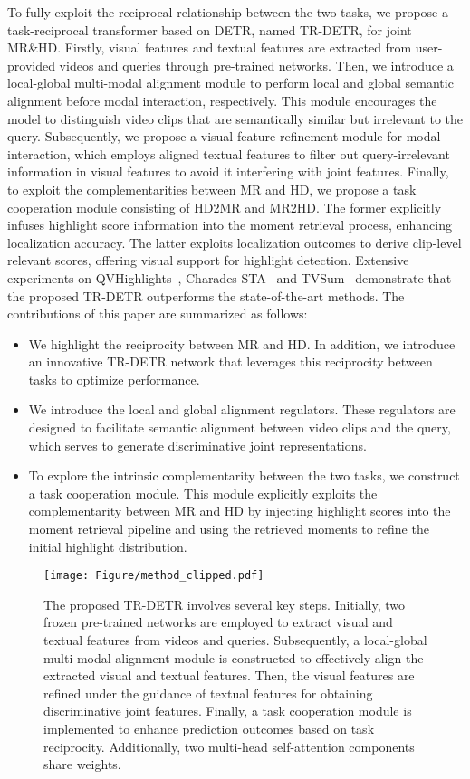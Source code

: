 To fully exploit the reciprocal relationship between the two tasks, we propose a task-reciprocal transformer based on DETR, named TR-DETR, for joint MR\&HD. Firstly, visual features and textual features are extracted from user-provided videos and queries through pre-trained networks. Then, we introduce a local-global multi-modal alignment module to perform local and global semantic alignment before modal interaction, respectively. This module encourages the model to distinguish video clips that are semantically similar but irrelevant to the query. Subsequently, we propose a visual feature refinement module for modal interaction, which employs aligned textual features to filter out query-irrelevant information in visual features to avoid it interfering with joint features. Finally, to exploit the complementarities between MR and HD, we propose a task cooperation module consisting of HD2MR and MR2HD. The former explicitly infuses highlight score information into the moment retrieval process, enhancing localization accuracy. The latter exploits localization outcomes to derive clip-level relevant scores, offering visual support for highlight detection.
Extensive experiments on QVHighlights~\cite{lei2021detecting}, Charades-STA~\cite{gao2017tall} and TVSum~\cite{song2015tvsum} demonstrate that the proposed TR-DETR outperforms the state-of-the-art methods. The contributions of this paper are summarized as follows:

\begin{itemize}
    \item We highlight the reciprocity between MR and HD. In addition, we introduce an innovative TR-DETR network that leverages this reciprocity between tasks to optimize performance.
    \item We introduce the local and global alignment regulators. These regulators are designed to facilitate semantic alignment between video clips and the query, which serves to generate discriminative joint representations.
    \item To explore the intrinsic complementarity between the two tasks, we construct a task cooperation module. This module explicitly exploits the complementarity between MR and HD by injecting highlight scores into the moment retrieval pipeline and using the retrieved moments to refine the initial highlight distribution.
\end{itemize}

\begin{figure*}[t]
\centering
\texttt{[image: Figure/method\_clipped.pdf]} %
\caption{The proposed TR-DETR involves several key steps. Initially, two frozen pre-trained networks are employed to extract visual and textual features from videos and queries. Subsequently, a local-global multi-modal alignment module is constructed to effectively align the extracted visual and textual features. Then, the visual features are refined under the guidance of textual features for obtaining discriminative joint features. Finally, a task cooperation module is implemented to enhance prediction outcomes based on task reciprocity. Additionally, two multi-head self-attention components share weights.}
\label{method}
\end{figure*}

